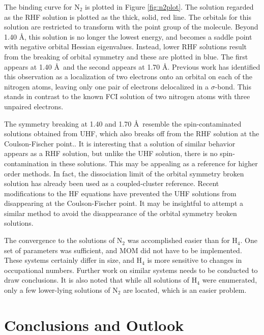 \documentclass[final,3p,times,twocolumn]{elsarticle}
\begin{document}
The binding curve for N$_2$ is plotted in Figure \ref{fig:n2plot}. The solution regarded as the RHF solution is plotted as the thick, solid, red line. The orbitals for this solution are restricted to transform with the point group of the molecule. Beyond 1.40 \AA, this solution is no longer the lowest energy, and becomes a saddle point with negative orbital Hessian eigenvalues.\cite{scfmd} Instead, lower RHF solutions result from the breaking of orbital symmetry and these are plotted in blue. The first appears at 1.40 \AA\ and the second appears at 1.70 \AA. Previous work has identified this observation as a localization of two electrons onto an orbital on each of the nitrogen atoms, leaving only one pair of electrons delocalized in a $\sigma$-bond.\cite{scfmd} This stands in contrast to the known FCI solution of two nitrogen atoms with three unpaired electrons.\cite{christiansen-2000}

The symmetry breaking at 1.40 and 1.70 \AA\ resemble the spin-contaminated solutions obtained from UHF, which also breaks off from the RHF solution at the Coulson-Fischer point.\cite{coulson-fischer}. It is interesting that a solution of similar behavior appears as a RHF solution, but unlike the UHF solution, there is no spin-contamination in these solutions. This may be appealing as a reference for higher order methods. In fact, the dissociation limit of the orbital symmetry broken solution has already been used as a coupled-cluster reference.\cite{paldus-2008} Recent modifications to the HF equations have prevented the UHF solutions from disappearing at the Coulson-Fischer point.\cite{thom-2014,thom-2016} It may be insightful to attempt a similar method to avoid the disappearance of the orbital symmetry broken solutions. %

The convergence to the solutions of N$_2$ was accomplished easier than for H$_4$. One set of parameters was sufficient, and MOM did not have to be implemented. These systems certainly differ in size, and H$_4$ is more sensitive to changes in occupational numbers. Further work on similar systems needs to be conducted to draw conclusions. It is also noted that while all solutions of H$_4$ were enumerated, only a few lower-lying solutions of N$_2$ are located, which is an easier problem.

\section{Conclusions and Outlook}
\label{sect:Concl}
\end{document}
